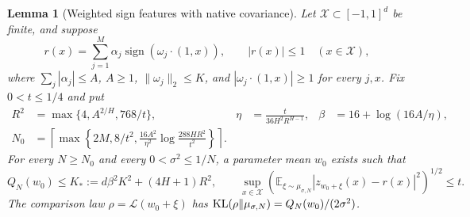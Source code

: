\documentclass[11pt]{article}
\newtheorem{lemma}[theorem]{Lemma}
\newcommand{\E}{\mathbb E}\newcommand{\Pp}{\mathbb P}\newcommand{\R}{\mathbb R}
\begin{document}
\begin{lemma}[Weighted sign features with native covariance]
\label{lem:memorizer}
Let $\mathcal X\subset[-1,1]^d$ be finite, and suppose
\[
 r(x)=\sum_{j=1}^M\alpha_j\operatorname{sign}(\omega_j\cdot(1,x)),\qquad |r(x)|\le1\quad(x\in\mathcal X),
\]
where $\sum_j|\alpha_j|\le A$, $A\ge1$, $\|\omega_j\|_2\le K$, and $|\omega_j\cdot(1,x)|\ge1$ for every $j,x$. Fix $0<t\le1/4$ and put
\begin{align*}
 R^2&=\max\{4,A^{2/H},768/t\},&
 \eta&=\frac{t}{36H^2R^{H-1}},&
 \beta&=16+\log(16A/\eta),\\
 N_0&=\left\lceil\max\left\{2M,8/t^2,
 \frac{16A^2}{\eta^2}\log\frac{288HR^2}{t^2}\right\}\right\rceil.
\end{align*}
For every $N\ge N_0$ and every $0<\sigma^2\le1/N$, a parameter mean $w_0$ exists such that
\[
 Q_N(w_0)\le K_*:=d\beta^2K^2+(4H+1)R^2,
 \qquad
 \sup_{x\in\mathcal X}\left(\E_{\xi\sim\mu_{\sigma,N}}|z_{w_0+\xi}(x)-r(x)|^2\right)^{1/2}\le t.
\]
The comparison law $\rho=\mathcal L(w_0+\xi)$ has $\operatorname{KL}(\rho\|\mu_{\sigma,N})=Q_N(w_0)/(2\sigma^2)$.
\end{lemma}
\end{document}
